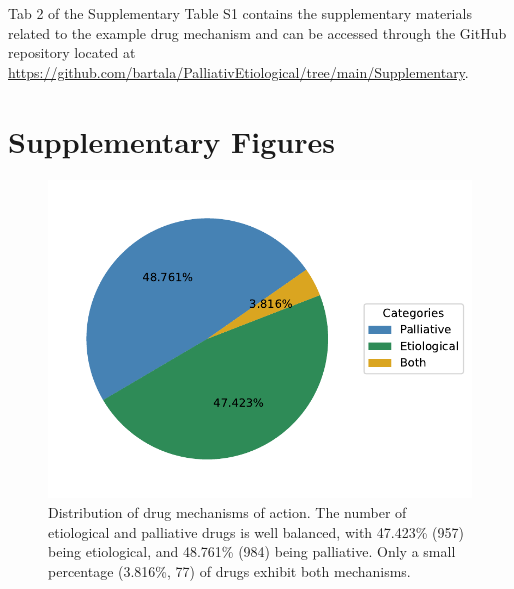 \documentclass[journal,twoside,web]{ieeecolor}
\begin{document}
Tab 2 of the Supplementary Table S1 contains the supplementary materials related to the example drug mechanism and can be accessed through the GitHub repository located at \url{https://github.com/bartala/PalliativEtiological/tree/main/Supplementary}.

\section{Supplementary Figures}
\begin{figure}[H]
    \centering
    \includegraphics[width=\linewidth]{Figures/EvsP.pdf}
    \caption{Distribution of drug mechanisms of action. The number of etiological and palliative drugs is well balanced, with 47.423\% (957) being etiological, and 48.761\% (984) being palliative.
    Only a small percentage (3.816\%, 77) of drugs exhibit both mechanisms.}
    \label{fig:EvsP}
\end{figure}
\end{document}
